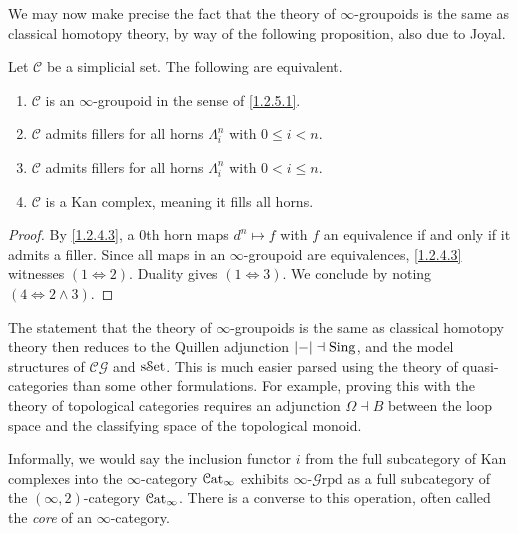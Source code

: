We may now make precise the fact that the theory of $\infty $-groupoids is the same as classical homotopy theory, by way of the following proposition, also due to Joyal.

\begin{proposition}\label{1.2.5.2}
	Let $\mathcal{C} $ be a simplicial set. The following are equivalent.
	\begin{enumerate}
		\item $\mathcal{C} $ is an $\infty $-groupoid in the sense of \cref{1.2.5.1}.
		\item $\mathcal{C} $ admits fillers for all horns $\Lambda _i^n$ with $0\leq i<n$.
		\item $\mathcal{C} $ admits fillers for all horns $\Lambda _i^n$ with $0<i\leq n$.
		\item $\mathcal{C} $ is a Kan complex, meaning it fills all horns.
	\end{enumerate}
\end{proposition}
\begin{proof}
	By \cref{1.2.4.3}, a 0th horn maps $d^n\mapsto f$ with $f$ an equivalence if and only if it admits a filler. Since all maps in an $\infty $-groupoid are equivalences, \cref{1.2.4.3} witnesses $(1\iff 2)$. Duality gives $(1\iff 3)$. We conclude by noting $(4\iff 2\land3)$.
\end{proof}

The statement that the theory of $\infty $-groupoids is the same as classical homotopy theory then reduces to the Quillen adjunction $\left| - \right| \dashv\operatorname{Sing}$, and the model structures of $\mathcal{C} \mathcal{G} $ and $\mathrm{s}\mathcal{S}\mathrm{et} $. This is much easier parsed using the theory of quasi-categories than some other formulations. For example, proving this with the theory of topological categories requires an adjunction $\Omega \dashv B$ between the loop space and the classifying space of the topological monoid.

Informally, we would say the inclusion functor $i$ from the full subcategory of Kan complexes into the $\infty $-category $\mathcal{C}\mathrm{at}_{\infty} $ exhibits $\infty $-$\mathcal{G} \mathrm{rpd} $ as a full subcategory of the $(\infty ,2)$-category $\mathcal{C}\mathrm{at}_{\infty} $. There is a converse to this operation, often called the \emph{core} of an $\infty $-category.

